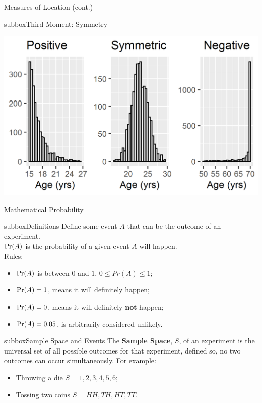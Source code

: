 \documentclass[10pt,a4paper]{article}
\def\Pr{\mathop{\rm Pr}}
\begin{document}
\begin{multicols}{3}
\begin{textbox}{Measures of Location (cont.)}
\begin{subbox}{subbox}{Third Moment: Symmetry}
\begin{center}
\tiny
    \includegraphics[width=\textwidth]{Figures/Measures_of_Location/skew.png}
  
    
\end{center}
\end{subbox}
\end{textbox}
\begin{textbox}{Mathematical Probability }
\begin{subbox}{subbox}{Definitions}
\tiny
Define some event $A$ that can be the outcome of an experiment.\\
$\Pr(A)$ is the probability of a given event $A$ will happen.\\
Rules:
\begin{itemize}
    \item $\Pr(A)$ is between $0$ and $1$, $0\leq Pr(A) \leq 1$;
    \item $\Pr(A)=1$, means it will definitely happen;
    \item $\Pr(A)=0$, means it will definitely \textbf{not} happen;
    \item $\Pr(A)=0.05$, is arbitrarily considered unlikely.
\end{itemize}
\end{subbox}

\begin{subbox}{subbox}{Sample Space and Events}
\tiny
The \textbf{Sample Space}, $S$, of an experiment is the universal set of all possible outcomes for that experiment, defined so, no two outcomes can occur simultaneously. For example:
\begin{itemize}
    \item Throwing a die $S={1,2,3,4,5,6};$
    \item Tossing two coins $S={HH,TH,HT,TT}.$
\end{itemize}


\end{subbox}
\end{textbox}
\end{multicols}
\end{document}
